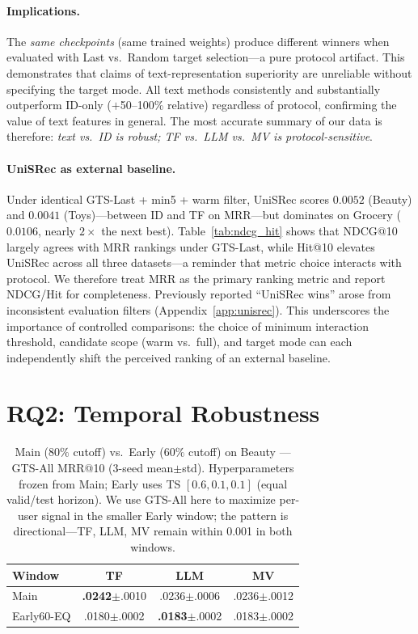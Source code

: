 \documentclass[sigconf,natbib=true,anonymous]{acmart}
\begin{document}
\paragraph{Implications.}
The \emph{same checkpoints} (same trained weights) produce different winners when evaluated with Last vs.\ Random target selection---a pure protocol artifact.
This demonstrates that claims of text-representation superiority are unreliable without specifying the target mode.
All text methods consistently and substantially outperform ID-only ($+$50--100\% relative) regardless of protocol, confirming the value of text features in general.
The most accurate summary of our data is therefore: \emph{text vs.\ ID is robust; TF vs.\ LLM vs.\ MV is protocol-sensitive}.

\paragraph{UniSRec as external baseline.}
Under identical GTS-Last + min5 + warm filter, UniSRec scores $0.0052$ (Beauty) and $0.0041$ (Toys)---between ID and TF on MRR---but dominates on Grocery ($0.0106$, nearly $2\times$ the next best).
Table~\ref{tab:ndcg_hit} shows that NDCG@10 largely agrees with MRR rankings under GTS-Last, while Hit@10 elevates UniSRec across all three datasets---a reminder that metric choice interacts with protocol.
We therefore treat MRR as the primary ranking metric and report NDCG/Hit for completeness.
Previously reported ``UniSRec wins'' arose from inconsistent evaluation filters (Appendix~\ref{app:unisrec}).
This underscores the importance of controlled comparisons: the choice of minimum interaction threshold, candidate scope (warm vs.\ full), and target mode can each independently shift the perceived ranking of an external baseline.

\section{RQ2: Temporal Robustness}
\label{sec:rq2}

\begin{table}[t]
\centering
\caption{%
Main ($80\%$ cutoff) vs.\ Early ($60\%$ cutoff) on Beauty --- GTS-All MRR@10 (3-seed mean$\pm$std).
Hyperparameters frozen from Main; Early uses TS $[0.6,0.1,0.1]$ (equal valid/test horizon).
We use GTS-All here to maximize per-user signal in the smaller Early window; the pattern is directional---TF, LLM, MV remain within 0.001 in both windows.%
}
\label{tab:early}
\small
\begin{tabular}{@{}lccc@{}}
\toprule
Window & TF & LLM & MV \\
\midrule
Main      & \textbf{.0242}\tiny{$\pm$.0010} & .0236\tiny{$\pm$.0006} & .0236\tiny{$\pm$.0012} \\
Early60-EQ & .0180\tiny{$\pm$.0002} & \textbf{.0183}\tiny{$\pm$.0002} & .0183\tiny{$\pm$.0002} \\
\bottomrule
\end{tabular}
\end{table}
\end{document}
